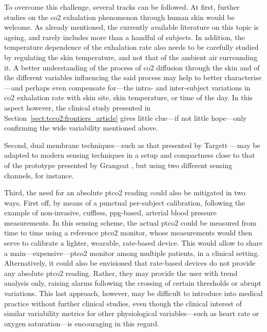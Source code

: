 \mfrin{}To overcome this challenge, several tracks can be followed. At first, further studies on the \gls{co2} exhalation phenomenon through human skin would be welcome. As already mentioned, the currently available literature on this topic is ageing, and rarely includes more than a handful of subjects. In addition, the temperature dependence of the exhalation rate also needs to be carefully studied by regulating the skin temperature, and not that of the ambient air surrounding it. A better understanding of the process of \gls{co2} diffusion through the skin and of the different variables influencing the said process may help to better characterise---and perhaps even compensate for---the intra- and inter-subject variations in \gls{co2} exhalation rate with skin site, skin temperature, or time of the day. In this aspect however, the clinical study presented in Section~\ref{sect:tcco2:frontiers_article} gives little clue---if not little hope---only confirming the wide variability mentioned above.

Second, dual membrane techniques---such as that presented by Targett \etal{}\cite{targett1984}---may be adapted to modern sensing techniques in a setup and compactness close to that of the prototype presented by Grangeat \etal{}\cite{grangeat2019}, but using two different sensing channels, for instance.

Third, the need for an absolute \gls{ptco2} reading could also be mitigated in two ways. First off, by means of a punctual per-subject calibration, following the example of non-invasive, cuffless, \gls{ppg}-based, arterial blood pressure measurements\cite{xing2019, shao2020}. In this sensing scheme, the actual \gls{ptco2} could be measured from time to time using a reference \gls{ptco2} monitor, whose measurements would then serve to calibrate a lighter, wearable, rate-based device. This would allow to share a main---expensive---\gls{ptco2} monitor among multiple patients, in a clinical setting. Alternatively, it could also be envisioned that rate-based devices do not provide any absolute \gls{ptco2} reading. Rather, they may provide the user with trend analysis only, raising alarms following the crossing of certain thresholds or abrupt variations. This last approach, however, may be difficult to introduce into medical practice without further clinical studies, even though the clinical interest of similar variability metrics for other physiological variables---such as heart rate\cite{kim2018} or oxygen saturation\cite{moret2014, clarke2016}---is encouraging in this regard.

